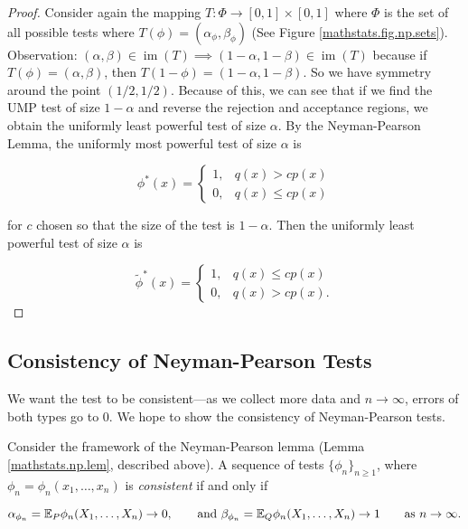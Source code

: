 \begin{proof}

Consider again the mapping \(T: \Phi \to [0,1] \times [0,1]\) where \(\Phi\) is the set of all possible tests where \(T(\phi) = (\alpha_\phi, \beta_\phi)\) (See Figure \ref{mathstats.fig.np.sets}). Observation: \((\alpha, \beta) \in \operatorname{im}(T) \implies (1 - \alpha, 1 - \beta) \in \operatorname{im}(T)\) because if \(T(\phi) = (\alpha, \beta)\), then \( T(1 - \phi) = (1 - \alpha, 1 - \beta)\). So we have symmetry around the point \((1/2, 1/2)\). Because of this, we can see that if we find the UMP test of size \(1-\alpha\) and reverse the rejection and acceptance regions, we obtain the uniformly least powerful test of size \(\alpha\). By the Neyman-Pearson Lemma, the uniformly most powerful test of size \(\alpha\) is

\[
\phi^*(x) = \begin{cases}
1, & q(x) > c p(x) \\
0, & q(x) \leq c p(x)
\end{cases}
\]

for \(c\) chosen so that the size of the test is \(1-\alpha\). Then the uniformly least powerful test of size \(\alpha\) is 

\[
\tilde{\phi}^*(x) = \begin{cases}
1, & q(x) \leq c p(x) \\
0, & q(x) > c p(x).
\end{cases}
\]




\end{proof}

\subsection{Consistency of Neyman-Pearson Tests}

We want the test to be consistent---as we collect more data and \(n \to \infty\), errors of both types go to 0. We hope to show the consistency of Neyman-Pearson tests.

\begin{definition}

Consider the framework of the Neyman-Pearson lemma (Lemma \ref{mathstats.np.lem}, described above). A sequence of tests \(\{\phi_n\}_{n \geq 1}\), where \(\phi_n = \phi_n(x_1, \ldots, x_n)\) is \textit{consistent} if and only if

\[
\alpha_{\phi_n} = \E_P \phi_n(X_1, \ldots, X_n) \to 0, \qquad \text{and } \beta_{\phi_n} = \E_Q \phi_n(X_1, \ldots, X_n) \to 1 \qquad \text{as } n \to \infty.
\]

\end{definition}

